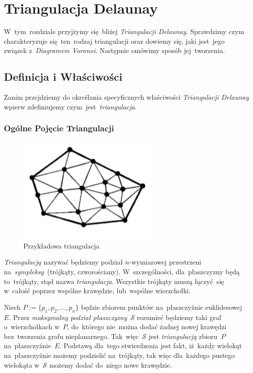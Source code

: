 \documentclass[skorowidz,autorrok,backref,xodstep,oswiadczenie]{wmimgr}
\begin{document}
\chapter{Triangulacja Delaunay}

W~tym~rozdziale przyjżymy się~bliżej \emph{Triangulacji Delaunay}. Sprawdzimy czym charakteryzuje się~ten~rodzaj triangulacji oraz dowiemy się, jaki jest~jego związek z~\emph{Diagramem Voronoi}. Następnie omówimy sposób jej~tworzenia.

\section{Definicja i Właściwości}

Zanim przejdziemy do określania specyficznych właściwości \emph{Triangulacji Delaunay} wpierw zdefiniujemy czym~jest~\emph{triangulacja}.

\subsection{Ogólne Pojęcie Triangulacji}

\begin{figure}[ht!]
\centering
\includegraphics[width=70mm]{images/triangulacja1.png}
\caption{Przykładowa triangulacja}
\label{triangulationexample}
\end{figure}

\emph{Triangulacją} nazywać będziemy podział $n$-wymiarowej przestrzeni na~\emph{sympleksy}~(trójkąty, czworościany). W~szczególności, dla~płaszczyzny będą to~trójkąty, stąd nazwa \emph{triangulacja}. Wszystkie trójkąty muszą łączyć~się w~całość poprzez wspólne krawędzie, lub~wspólne wierzchołki.

Niech $P:=\{ p_{1},p_{2},...,p_{n} \}$ będzie zbiorem punktów na~płaszczyźnie euklidesowej $E$. Przez \emph{maksymalny podział płaszczyzny}~$\mathcal{S}$ rozumieć będziemy taki graf o~wierzchołkach w~$P$, do~którego nie~można dodać żadnej nowej krawędzi bez~tworzenia grafu nieplanarnego. Tak~więc~$\mathcal{S}$ jest \emph{triangulacją} zbioru~$P$ na~płaszczyźnie~$E$. Podstawą dla~tego stwierdzenia jest fakt, iż~każdy wielokąt na~płaszczyźnie możemy podzielić na~trójkąty\cite{geometria}, tak więc dla~każdego pustego wielokąta w~$\mathcal{S}$ możemy dodać do~niego nowe krawędzie.
\end{document}
